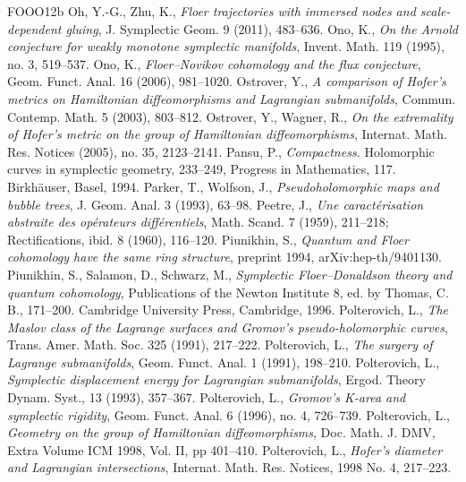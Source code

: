 \begin{thebibliography}{FOOO12b}
 Oh, Y.-G., Zhu, K., \textit{Floer trajectories with immersed nodes and scale-dependent gluing}, J. Symplectic Geom. 9 (2011), 483--636.
 Ono, K., \textit{On the Arnold conjecture for weakly monotone symplectic manifolds}, Invent. Math. 119 (1995), no. 3, 519--537.
 Ono, K., \textit{Floer--Novikov cohomology and the flux conjecture}, Geom. Funct. Anal. 16 (2006), 981--1020.
 Ostrover, Y., \textit{A comparison of Hofer\textquoteright{}s metrics on Hamiltonian diffeomorphisms and Lagrangian submanifolds}, Commun. Contemp. Math. 5 (2003), 803--812.
 Ostrover, Y., Wagner, R., \textit{On the extremality of Hofer\textquoteright{}s metric on the group of Hamiltonian diffeomorphisms}, Internat. Math. Res. Notices (2005), no. 35, 2123--2141.
 Pansu, P., \textit{Compactness.} Holomorphic curves in symplectic geometry, 233--249, Progress in Mathematics, 117. Birkhäuser, Basel, 1994.
 Parker, T., Wolfson, J., \textit{Pseudoholomorphic maps and bubble trees}, J. Geom. Anal. 3 (1993), 63--98.
 Peetre, J., \textit{Une caractérisation abstraite des opérateurs différentiels}, Math. Scand. 7 (1959), 211--218; Rectifications, ibid. 8 (1960), 116--120.
 Piunikhin, S., \textit{Quantum and Floer cohomology have the same ring structure}, preprint 1994, arXiv:hep-th/9401130.
 Piunikhin, S., Salamon, D., Schwarz, M., \textit{Symplectic Floer--Donaldson theory and quantum cohomology}, Publications of the Newton Institute 8, ed. by Thomas, C. B., 171--200. Cambridge University Press, Cambridge, 1996.
 Polterovich, L., \textit{The Maslov class of the Lagrange surfaces and Gromov\textquoteright{}s pseudo-holomorphic curves}, Trans. Amer. Math. Soc. 325 (1991), 217--222.
 Polterovich, L., \textit{The surgery of Lagrange submanifolds}, Geom. Funct. Anal. 1 (1991), 198--210.
 Polterovich, L., \textit{Symplectic displacement energy for Lagrangian submanifolds}, Ergod. Theory Dynam. Syst., 13 (1993), 357--367.
 Polterovich, L., \textit{Gromov\textquoteright{}s K-area and symplectic rigidity}, Geom. Funct. Anal. 6 (1996), no. 4, 726--739.
 Polterovich, L., \textit{Geometry on the group of Hamiltonian diffeomorphisms}, Doc. Math. J. DMV, Extra Volume ICM 1998, Vol. II, pp 401--410.
 Polterovich, L., \textit{Hofer\textquoteright{}s diameter and Lagrangian intersections}, Internat. Math. Res. Notices, 1998 No. 4, 217--223.

\end{thebibliography}
